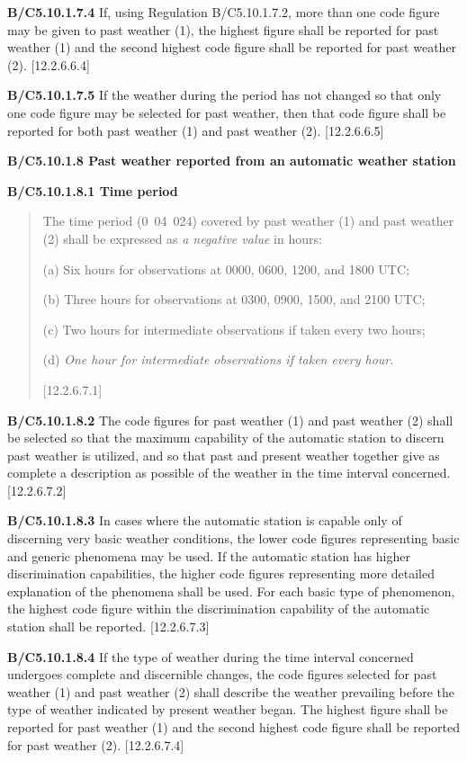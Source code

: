 \textbf{B/C5.10.1.7.4} If, using Regulation B/C5.10.1.7.2, more than one code figure may be given to past weather (1), the highest figure shall be reported for past weather (1) and the second highest code figure shall be reported for past weather (2). {[}12.2.6.6.4{]}

\textbf{B/C5.10.1.7.5} If the weather during the period has not changed so that only one code figure may be selected for past weather, then that code figure shall be reported for both past weather (1) and past weather (2). {[}12.2.6.6.5{]}

\textbf{B/C5.10.1.8 Past weather reported from an automatic weather station}

\textbf{B/C5.10.1.8.1 Time period}

\begin{quote}
The time period (0~04~024) covered by past weather (1) and past weather (2) shall be expressed as \emph{a negative value} in hours:

(a) Six hours for observations at 0000, 0600, 1200, and 1800 UTC;

(b) Three hours for observations at 0300, 0900, 1500, and 2100 UTC;

(c) Two hours for intermediate observations if taken every two hours;

(d) \emph{One hour for intermediate observations if taken every hour}.

{[}12.2.6.7.1{]}
\end{quote}

\textbf{B/C5.10.1.8.2} The code figures for past weather (1) and past weather (2) shall be selected so that the maximum capability of the automatic station to discern past weather is utilized, and so that past and present weather together give as complete a description as possible of the weather in the time interval concerned. {[}12.2.6.7.2{]}

\textbf{B/C5.10.1.8.3} In cases where the automatic station is capable only of discerning very basic weather conditions, the lower code figures representing basic and generic phenomena may be used. If the automatic station has higher discrimination capabilities, the higher code figures representing more detailed explanation of the phenomena shall be used. For each basic type of phenomenon, the highest code figure within the discrimination capability of the automatic station shall be reported. {[}12.2.6.7.3{]}

\textbf{B/C5.10.1.8.4} If the type of weather during the time interval concerned undergoes complete and discernible changes, the code figures selected for past weather (1) and past weather (2) shall describe the weather prevailing before the type of weather indicated by present weather began. The highest figure shall be reported for past weather (1) and the second highest code figure shall be reported for past weather (2). {[}12.2.6.7.4{]}


